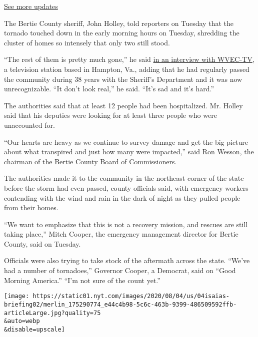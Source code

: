 \href{https://www.nytimes.com/2020/08/04/us/isaias-storm-updates.html?action=click\&pgtype=Article\&state=default\&region=MAIN_CONTENT_1\&context=storylines_live_updates}{See
more updates}

The Bertie County sheriff, John Holley, told reporters on Tuesday that
the tornado touched down in the early morning hours on Tuesday,
shredding the cluster of homes so intensely that only two still stood.

``The rest of them is pretty much gone,'' he said
\href{https://www.13newsnow.com/video/news/local/north-carolina/bertie-county-sheriff-john-holley-talks-about-fatality-in-north-carolina/291-99306d30-d640-4e9a-97fa-0221d565f5df}{in
an interview with WVEC-TV}, a television station based in Hampton, Va.,
adding that he had regularly passed the community during 38 years with
the Sheriff's Department and it was now unrecognizable. ``It don't look
real,'' he said. ``It's sad and it's hard.''

The authorities said that at least 12 people had been hospitalized. Mr.
Holley said that his deputies were looking for at least three people who
were unaccounted for.

``Our hearts are heavy as we continue to survey damage and get the big
picture about what transpired and just how many were impacted,'' said
Ron Wesson, the chairman of the Bertie County Board of Commissioners.

The authorities made it to the community in the northeast corner of the
state before the storm had even passed, county officials said, with
emergency workers contending with the wind and rain in the dark of night
as they pulled people from their homes.

``We want to emphasize that this is not a recovery mission, and rescues
are still taking place,'' Mitch Cooper, the emergency management
director for Bertie County, said on Tuesday.

Officials were also trying to take stock of the aftermath across the
state. ``We've had a number of tornadoes,'' Governor Cooper, a Democrat,
said on ``Good Morning America.'' ``I'm not sure of the count yet.''

\texttt{[image: https://static01.nyt.com/images/2020/08/04/us/04isaias-briefing02/merlin\_175290774\_e44c4b98-5c6c-463b-9399-486509592ffb-articleLarge.jpg?quality=75\\\&auto=webp\\\&disable=upscale]}

\hypertarget{-2}{%
\subsection{}\label{-2}}


